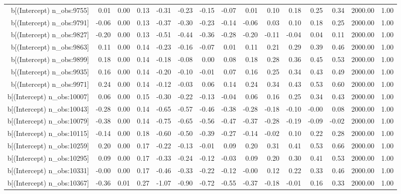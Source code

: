 \begin{table}[ht]
\begin{tabular}{rrrrrrrrrrrrrrr}
  b[(Intercept) n\_obs:9755] & 0.01 & 0.00 & 0.13 & -0.31 & -0.23 & -0.15 & -0.07 & 0.01 & 0.10 & 0.18 & 0.25 & 0.34 & 2000.00 & 1.00 \\ 
  b[(Intercept) n\_obs:9791] & -0.06 & 0.00 & 0.13 & -0.37 & -0.30 & -0.23 & -0.14 & -0.06 & 0.03 & 0.10 & 0.18 & 0.25 & 2000.00 & 1.00 \\ 
  b[(Intercept) n\_obs:9827] & -0.20 & 0.00 & 0.13 & -0.51 & -0.44 & -0.36 & -0.28 & -0.20 & -0.11 & -0.04 & 0.04 & 0.11 & 2000.00 & 1.00 \\ 
  b[(Intercept) n\_obs:9863] & 0.11 & 0.00 & 0.14 & -0.23 & -0.16 & -0.07 & 0.01 & 0.11 & 0.21 & 0.29 & 0.39 & 0.46 & 2000.00 & 1.00 \\ 
  b[(Intercept) n\_obs:9899] & 0.18 & 0.00 & 0.14 & -0.18 & -0.08 & 0.00 & 0.08 & 0.18 & 0.28 & 0.36 & 0.45 & 0.53 & 2000.00 & 1.00 \\ 
  b[(Intercept) n\_obs:9935] & 0.16 & 0.00 & 0.14 & -0.20 & -0.10 & -0.01 & 0.07 & 0.16 & 0.25 & 0.34 & 0.43 & 0.49 & 2000.00 & 1.00 \\ 
  b[(Intercept) n\_obs:9971] & 0.24 & 0.00 & 0.14 & -0.12 & -0.03 & 0.06 & 0.14 & 0.24 & 0.34 & 0.43 & 0.53 & 0.60 & 2000.00 & 1.00 \\ 
  b[(Intercept) n\_obs:10007] & 0.06 & 0.00 & 0.15 & -0.30 & -0.22 & -0.13 & -0.04 & 0.06 & 0.16 & 0.25 & 0.34 & 0.43 & 2000.00 & 1.00 \\ 
  b[(Intercept) n\_obs:10043] & -0.28 & 0.00 & 0.14 & -0.65 & -0.57 & -0.46 & -0.38 & -0.28 & -0.18 & -0.10 & -0.00 & 0.08 & 2000.00 & 1.00 \\ 
  b[(Intercept) n\_obs:10079] & -0.38 & 0.00 & 0.14 & -0.75 & -0.65 & -0.56 & -0.47 & -0.37 & -0.28 & -0.19 & -0.09 & -0.02 & 2000.00 & 1.00 \\ 
  b[(Intercept) n\_obs:10115] & -0.14 & 0.00 & 0.18 & -0.60 & -0.50 & -0.39 & -0.27 & -0.14 & -0.02 & 0.10 & 0.22 & 0.28 & 2000.00 & 1.00 \\ 
  b[(Intercept) n\_obs:10259] & 0.20 & 0.00 & 0.17 & -0.22 & -0.13 & -0.01 & 0.09 & 0.20 & 0.31 & 0.41 & 0.53 & 0.66 & 2000.00 & 1.00 \\ 
  b[(Intercept) n\_obs:10295] & 0.09 & 0.00 & 0.17 & -0.33 & -0.24 & -0.12 & -0.03 & 0.09 & 0.20 & 0.30 & 0.41 & 0.53 & 2000.00 & 1.00 \\ 
  b[(Intercept) n\_obs:10331] & -0.00 & 0.00 & 0.17 & -0.46 & -0.33 & -0.22 & -0.12 & -0.00 & 0.12 & 0.22 & 0.33 & 0.46 & 2000.00 & 1.00 \\ 
  b[(Intercept) n\_obs:10367] & -0.36 & 0.01 & 0.27 & -1.07 & -0.90 & -0.72 & -0.55 & -0.37 & -0.18 & -0.01 & 0.16 & 0.33 & 2000.00 & 1.00 \\ 

\end{tabular}
\end{table}
